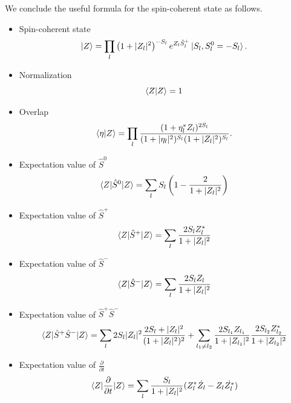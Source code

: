 \documentclass[11pt]{book} %
\begin{document}
We conclude the useful formula for the spin-coherent state as follows.
\begin{framed}
  \begin{itemize}
 \item Spin-coherent state 
\begin{equation}
	\ket{Z} = \prod_{l} \left(1+|Z_l|^2\right)^{-S_l}
	e^{Z_l \hat{S}_l^{+}} \ket{S_l, S_l^0=-S_l} .
 \label{coherent}
\end{equation}
 \item Normalization
\begin{equation}
	\braket{Z|Z} = 1
\end{equation}
 \item Overlap
\begin{equation}
	  \braket{\eta|Z} = \prod_l \frac{(1+\eta_l^*Z_l)^{2S_l}}{(1+|\eta_l|^2)^{S_l}(1+|Z_l|^2)^{S_l}} .
  \label{overlap}
\end{equation}
 \item Expectation value of $\hat{S}^0$
\begin{equation}
     \braket{Z|\hat{S}^0|Z} = \sum_l S_l\left( 1-\frac{2}{1+|Z_l|^2} \right)
\end{equation}
 \item Expectation value of $\hat{S}^+$
\begin{equation}
     \braket{Z|\hat{S}^+|Z} = \sum_l \frac{2S_lZ_l^*}{1+|Z_l|^2}
\end{equation}
 \item Expectation value of $\hat{S}^-$
\begin{equation}
     \braket{Z|\hat{S}^-|Z} = \sum_l \frac{2S_lZ_l}{1+|Z_l|^2}
\end{equation}
 \item Expectation value of $\hat{S}^+\hat{S}^-$
\begin{equation}
    \braket{Z|\hat{S}^+\hat{S}^-|Z} = \sum_l 2S_l|Z_l|^2\frac{2S_l+|Z_l|^2}{(1+|Z_l|^2)^2}
    + \sum_{l_1 \neq l_2} \frac{2S_{l_1}Z_{l_1}}{1+|Z_{l_1}|^2}\frac{2S_{l_2}Z_{l_2}^*}{1+|Z_{l_2}|^2}
\end{equation}
 \item Expectation value of $\frac{\partial}{\partial t}$
\begin{equation}
       \braket{Z|\frac{\partial}{\partial t}|Z} = \sum_l \frac{S_l}{1+|Z_l|^2}(Z_l^*\dot{Z_l}-Z_l\dot{Z_l^*})
	\label{ddt}
\end{equation}
\end{itemize}
\end{framed}
\end{document}
